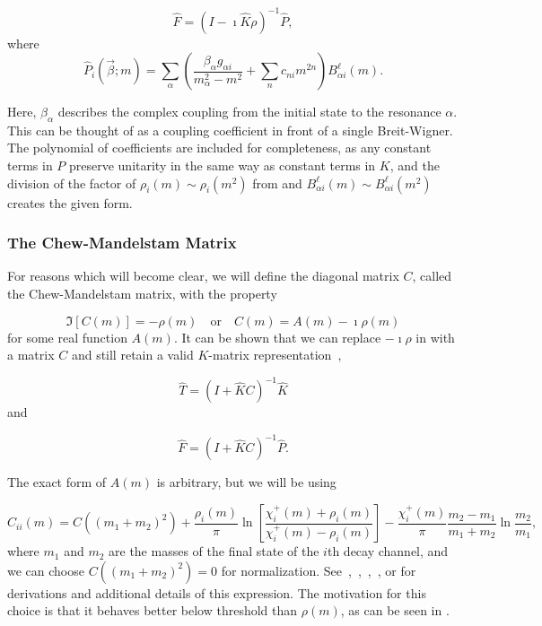 \begin{equation}
  \hat{F} = (I - \imath\hat{K}\rho)^{-1}\hat{P},
  \label{eq:k-matrix-production-amplitude}
\end{equation}
where
\begin{equation}
  \hat{P}_i(\vec{\beta}; m) = \sum_\alpha \left(\frac{\beta_\alpha g_{\alpha i}}{m_\alpha^2 - m^2} + \sum_n c_{ni} m^{2n} \right)B_{\alpha i}^{\ell}(m).
  \label{eq:p-vector}
\end{equation}

Here, $\beta_\alpha$ describes the complex coupling from the initial state to the resonance $\alpha$. This can be thought of as a coupling coefficient in front of a single Breit-Wigner. The polynomial of coefficients are included for completeness, as any constant terms in $P$ preserve unitarity in the same way as constant terms in $K$, and the division of the factor of $\rho_i(m) \sim \rho_i(m^2)$ from  and $B^\ell_{\alpha i}(m) \sim B^\ell_{\alpha i}(m^2)$ creates the given form.

\subsubsection{The Chew-Mandelstam Matrix}

For reasons which will become clear, we will define the diagonal matrix $C$, called the Chew-Mandelstam matrix, with the property

\begin{equation}
  \Im[C(m)] = -\rho(m)\quad\text{or}\quad C(m) = A(m) - \imath\rho(m)
\end{equation}
for some real function $A(m)$. It can be shown that we can replace $-\imath\rho$ in  with a matrix $C$ and still retain a valid $K$-matrix representation~\cite{Wilson2015},

\begin{equation}
  \hat{T} = (I + \hat{K}C)^{-1}\hat{K}
\end{equation}
and

\begin{equation}
  \hat{F} = (I + \hat{K}C)^{-1}\hat{P}.
  \label{eq:k-matrix-production-amplitude-chew}
\end{equation}

The exact form of $A(m)$ is arbitrary, but we will be using

\begin{equation}
  C_{ii}(m) = C((m_1 + m_2)^2) + \frac{\rho_i(m)}{\pi}\ln\left[\frac{\chi^+_i(m) + \rho_i(m)}{\chi^+_i(m) - \rho_i(m)}\right] - \frac{\chi^+_i(m)}{\pi}\frac{m_2 - m_1}{m_1 + m_2}\ln\frac{m_2}{m_1},
  \label{eq:chew-mandelstam}
\end{equation}
where $m_1$ and $m_2$ are the masses of the final state of the $i$th decay channel, and we can choose $C((m_1 + m_2)^2) = 0$ for normalization. See~\cite{Oller1999},~\cite{Basdevant1977},~\cite{Oller2001},~\cite{Reid1984}, or  for derivations and additional details of this expression. The motivation for this choice is that it behaves better below threshold than $\rho(m)$, as can be seen in .

